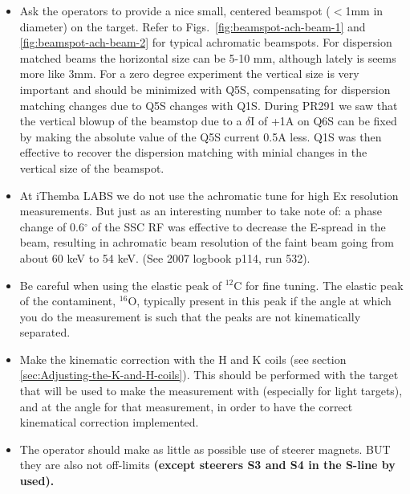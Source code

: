 \documentclass[11pt]{report}
\begin{document}
\begin{itemize}
\item Ask the operators to provide a nice small, centered beamspot ($<$1mm in diameter) on the target. 
      Refer to Figs.~\ref{fig:beamspot-ach-beam-1} and \ref{fig:beamspot-ach-beam-2} for typical 
	achromatic beamspots. For dispersion matched beams the horizontal size can be 5-10 mm, although lately is seems more like 3mm.
      For a zero degree experiment the vertical size is very important and should be minimized with Q5S, compensating for 
 	dispersion matching changes  due to Q5S changes with Q1S.
	During PR291 we saw that the vertical blowup of the beamstop due to a $\delta$I of +1A on Q6S can be fixed by making
	the absolute value of the Q5S current 0.5A less. Q1S was then effective to recover the dispersion matching with minial
	changes in the vertical size of the beamspot.
\item At iThemba LABS we do not use the achromatic tune for high Ex resolution measurements. But just
      as an interesting number to take note of:
      a phase change of 0.6$^{\circ}$ of the SSC RF was effective to decrease 
      the E-spread in the beam, resulting in achromatic beam resolution
      of the faint beam going from about 60 keV to 54 keV. (See 2007 logbook p114, run 532).
\item Be careful when using the elastic peak of $^{12}$C for fine tuning.
      The elastic peak of the contaminent, $^{16}$O, typically present in this peak if the 
      angle at which you do the measurement is such that the peaks are not kinematically separated.
\item Make the kinematic correction with the H and K coils (see section \ref{sec:Adjusting-the-K-and-H-coils}). 
      This should be performed with the target that will be used to
      make the measurement with (especially for light targets), and at the angle 
      for that measurement, in order to have the correct kinematical correction implemented.
\item The operator should make as little as possible use of steerer magnets. BUT they are also not off-limits 
      \bf{ (except  steerers S3 and S4 in the S-line by used)}.

\end{itemize}
\end{document}
